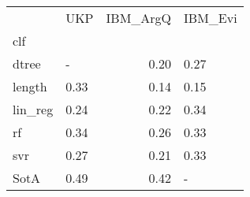\begin{tabular}{llrl}
\toprule
{} &   UKP &  IBM\_ArgQ & IBM\_Evi \\
clf     &       &           &         \\
\midrule
dtree   &     - &      0.20 &    0.27 \\
length  &  0.33 &      0.14 &    0.15 \\
lin\_reg &  0.24 &      0.22 &    0.34 \\
rf      &  0.34 &      0.26 &    0.33 \\
svr     &  0.27 &      0.21 &    0.33 \\
SotA    &  0.49 &      0.42 &       - \\
\bottomrule
\end{tabular}

